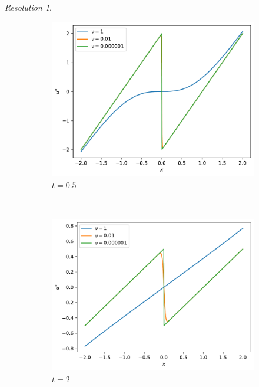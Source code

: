 \documentclass[10pt,a4paper]{article}
\theoremstyle{remark}
\newtheorem*{res}{Resolution}
\begin{document}
\begin{res}
\begin{enumerate}
\begin{figure}[ht]
\begin{subfigure}{0.32\textwidth}
              \includegraphics[width=\textwidth]{Images/burger_t=0.5.pdf}
              \caption{$t = 0.5$}
            \end{subfigure}\\
            \begin{subfigure}{0.32\textwidth}
              \centering
              \includegraphics[width=\textwidth]{Images/burger_t=2.pdf}
              \caption{$t = 2$}
            \end{subfigure}
            \begin{subfigure}{0.32\textwidth}
              \centering

\end{subfigure}
\end{figure}
\end{enumerate}
\end{res}
\end{document}
